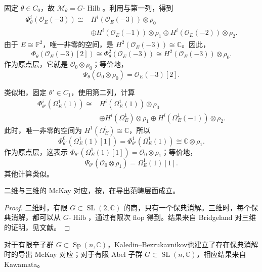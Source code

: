 \begin{example}
固定 $\theta\in C_0$，故 $\mathcal{M}_\theta=G\text{-}\operatorname{Hilb}$。利用与第一列，得到
\[
\begin{aligned}
\Phi_\theta^i(\mathcal{O}_E(-3))\cong{}&
H^i(\mathcal{O}_E(-3))\otimes\rho_0\\
&\oplus H^i(\mathcal{O}_E(-1))\otimes\rho_1
\oplus H^i(\mathcal{O}_E(-2))\otimes\rho_2.
\end{aligned}
\]
由于 $E\cong\mathbb{P}^2$，唯一非零的空间，是 $H^2(\mathcal{O}_E(-3))\cong\mathbb{C}$。因此，
\[
\Phi_\theta(\mathcal{O}_E(-3)[2])
\cong\Phi_\theta^2(\mathcal{O}_E(-3))
\cong H^2(\mathcal{O}_E(-3))\otimes\rho_0.
\]
作为原点层，它就是 $\mathcal{O}_0\otimes\rho_0$；等价地，
\[
\Psi_\theta(\mathcal{O}_0\otimes\rho_0)=\mathcal{O}_E(-3)[2].
\]

类似地，固定 $\theta'\in C_1$，使用第二列，计算
\[
\begin{aligned}
\Phi_{\theta'}^i(\Omega_E^1(1))\cong{}&
H^i(\Omega_E^1(1))\otimes\rho_0\\
&\oplus H^i(\Omega_E^1)\otimes\rho_1
\oplus H^i(\Omega_E^1(-1))\otimes\rho_2.
\end{aligned}
\]
此时，唯一非零的空间为 $H^1(\Omega_E^1)\cong\mathbb{C}$，所以
\[
\Phi_{\theta'}^0(\Omega_E^1(1)[1])
=\Phi_{\theta'}^1(\Omega_E^1(1))\cong\mathbb{C}\otimes\rho_1.
\]
作为原点层，这表示 $\Phi_{\theta'}(\Omega_E^1(1)[1])=\mathcal{O}_0\otimes\rho_1$；等价地，
\[
\Psi_{\theta'}(\mathcal{O}_0\otimes\rho_1)=\Omega_E^1(1)[1].
\]
其他计算类似。
\end{example}

\begin{corollary}\label{cor:4.96}
二维与三维的 McKay 对应，按，在导出范畴层面成立。
\end{corollary}
\begin{proof}
二维时，有限 $G\subset\operatorname{SL}(2,\mathbb{C})$ 的商，只有一个保典消解。三维时，每个保典消解，都可以从 $G\text{-}\operatorname{Hilb}$，通过有限次 flop 得到。结果来自 Bridgeland 对三维的证明，见文献。\BookQED
\end{proof}

\begin{note}[97]\label{note:4.97}
对于有限辛子群 $G\subset\operatorname{Sp}(n,\mathbb{C})$，Kaledin--Bezrukavnikov也建立了存在保典消解时的导出 McKay 对应；对于有限 Abel 子群 $G\subset\operatorname{SL}(n,\mathbb{C})$，相应结果来自 Kawamata。
\end{note}
